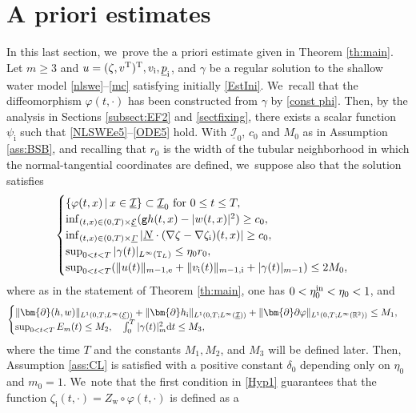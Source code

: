 \documentclass[JEP,XML,SOM,Unicode,NoFloatCountersInSection,published]{cedram}
\newcommand{\gr}{{\mathtt g}}
\newcommand{\R}{{\mathbb R}}
\newcommand{\cI}{{\mathcal I}}
\newcommand{\cE}{{\mathcal E}}
\newcommand{\ul}[1]{\underline{#1}}
\newcommand{\itGamma}{\mathit{\Gamma}}
\theoremstyle{definition}
\begin{document}
\section{A priori estimates}\label{sect:APE}
In this last section, we~prove the a priori estimate given in Theorem \ref{th:main}.
Let $m\geq 3$ and $u=(\zeta,v^{\rm T})^{\rm T}, v_\mathrm{i}, \ul{p}_\mathrm{i}$, and $\gamma$ be a regular solution
to the shallow water model \eqref{nlswe}--\eqref{mc} satisfying initially \eqref{EstIni}. We~recall that the diffeomorphism $\varphi(t,\cdot)$ has been constructed from $\gamma$ by \eqref{const phi}.
Then, by the analysis in Sections \ref{subsect:EF2} and \ref{sectfixing},
there exists a scalar function $\psi_\mathrm{i}$ such that \eqref{NLSWEe5}--\eqref{ODE5} hold.
With $ \ul{\cI}_0$, $c_0$ and $M_0$ as in Assumption \ref{ass:BSB},
and recalling that $r_0$ is the width of the tubular neighborhood in which the normal-tangential coordinates are defined, we~suppose also that the solution satisfies
\begin{equation}\label{Hyp1}
\begin{cases}
\{ \varphi(t,x) \,|\, x\in\ul{\cI} \} \subset \ul{\cI}_0 \mbox{ for } 0\leq t\leq T, \\
\inf_{(t,x)\in(0,T)\times\ul{\cE}}(\gr h(t,x)-|w(t,x)|^2) \geq c_0, \\
\inf_{(t,x)\in(0,T)\times\ul{\itGamma}}| \ul{N}\cdot(\nabla\zeta-\nabla\zeta_\mathrm{i})(t,x)| \geq c_0, \\
\sup_{0<t<T}|\gamma(t)|_{L^\infty(\mathbb{T}_L)} \leq \eta_0r_0, \\
\sup_{0<t<T}(\|u(t)\|_{m-1,{\rm e}} + \|v_\mathrm{i}(t)\|_{m-1,{\rm i}} + |\gamma(t)|_{m-1}) \leq 2M_0,
\end{cases}
\end{equation}
where as in the statement of Theorem \ref{th:main}, one has $0<\eta_0^{\rm in}<\eta_0<1$, and
\begin{equation}\label{Hyp2}
\begin{cases}
\|\bm{\partial}(h,w)\|_{L^1(0,T;L^\infty(\ul{\cE}))} + \|\bm{\partial} h_\mathrm{i}\|_{L^1(0,T;L^\infty(\ul{\cI}))}
+ \|\bm{\partial}\partial\varphi\|_{L^1(0,T;L^\infty(\R^2))} \leq M_1, \\
\sup_{0<t<T}E_m(t) \leq M_2, \quad \int_0^T|\gamma(t)|_m^2{\rm d}t \leq M_3,
\end{cases}
\end{equation}
where the time $T$ and the constants $M_1, M_2$, and $M_3$ will be defined later.
Then, Assumption \ref{ass:CL} is satisfied with a positive constant $\delta_0$ depending only on $\eta_0$ and $m_0=1$. We~note that the first condition in \eqref{Hyp1} guarantees that the function $\zeta_\mathrm{i}(t,\cdot)=Z_\mathrm{w}\circ\varphi(t,\cdot)$ is defined as a
\end{document}
